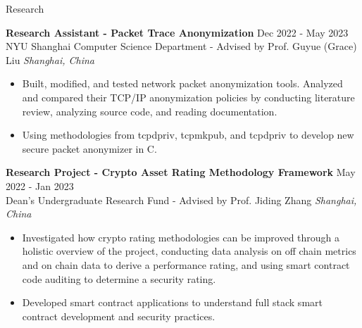 \documentclass{cv} %
\begin{document}
\begin{rSection}{Research}

	\textbf{Research Assistant - Packet Trace Anonymization} \hfill Dec 2022 - May 2023 \\
	NYU Shanghai Computer Science Department - Advised by Prof. Guyue (Grace) Liu \hfill \textit{Shanghai, China}
	\begin{itemize}
		\item Built, modified, and tested network packet anonymization tools. Analyzed and compared their TCP/IP anonymization policies by conducting literature review, analyzing source code, and reading documentation.
		\item Using methodologies from tcpdpriv, tcpmkpub, and tcpdpriv to develop new secure packet anonymizer in C.
	\end{itemize}

	\textbf{Research Project - Crypto Asset Rating Methodology Framework} \hfill May 2022 - Jan 2023 \\
	Dean’s Undergraduate Research Fund - Advised by Prof. Jiding Zhang \hfill \textit{Shanghai, China}
	\begin{itemize}
		\item Investigated how crypto rating methodologies can be improved through a holistic overview of the project, conducting data analysis on off chain metrics and on chain data to derive a performance rating, and using smart contract code auditing to determine a security rating.
		\item Developed smart contract applications to understand full stack smart contract development and security practices.
	\end{itemize}

\end{rSection}

\end{document}
